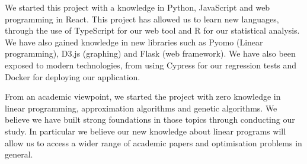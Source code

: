 We started this project with a knowledge in Python, JavaScript and web programming in React. This project has allowed us to learn new languages, through the use of TypeScript for our web tool and R for our statistical analysis. We have also gained knowledge in new libraries such as Pyomo (Linear programming), D3.js (graphing) and Flask (web framework). We have also been exposed to modern technologies, from using Cypress for our regression tests and Docker for deploying our application.

From an academic viewpoint, we started the project with zero knowledge in linear programming, approximation algorithms and genetic algorithms. We believe we have built strong foundations in those topics through conducting our study. In particular we believe our new knowledge about linear programs will allow us to access a wider range of academic papers and optimisation problems in general.